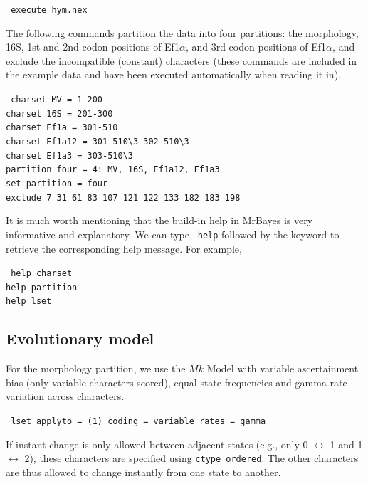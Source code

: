 \documentclass[12pt]{article}
\begin{document}
\medskip
{\tt \color{red} \noindent
execute hym.nex
}
\medskip

\noindent The following commands partition the data into four partitions:
the morphology, 16S, 1st and 2nd codon positions of Ef1$\alpha$, and 3rd codon positions of Ef1$\alpha$,
and exclude the incompatible (constant) characters
(these commands are included in the example data and have been executed automatically when reading it in).

\medskip
{\tt \color{red} \noindent
charset MV = 1-200      \\
charset 16S = 201-300   \\
charset Ef1a = 301-510  \\
charset Ef1a12 = 301-510\textbackslash 3 302-510\textbackslash 3 \\
charset Ef1a3 = 303-510\textbackslash 3         \\
partition four = 4: MV, 16S, Ef1a12, Ef1a3      \\
set partition = four    \\
exclude 7 31 61 83 107 121 122 133 182 183 198
}
\medskip

It is much worth mentioning that the build-in help in MrBayes is very informative and explanatory. We can type {\tt \color{red} help} followed by the keyword to retrieve the corresponding help message. For example,

\medskip
{\tt \color{red} \noindent
help charset   \\
help partition \\
help lset
}
\medskip

\subsection{Evolutionary model}


For the morphology partition, we use the $Mk$ Model \citep{Lewis:2001wu} with variable ascertainment bias (only variable characters scored), equal state frequencies and gamma rate variation across characters.

\medskip
{\tt \color{red} \noindent
lset applyto = (1) coding = variable rates = gamma
}
\medskip

\noindent If instant change is only allowed between adjacent states (e.g., only 0 $\leftrightarrow$ 1 and 1 $\leftrightarrow$ 2), these characters are specified using {\tt ctype ordered}.
The other characters are thus allowed to change instantly from one state to another.
\end{document}
